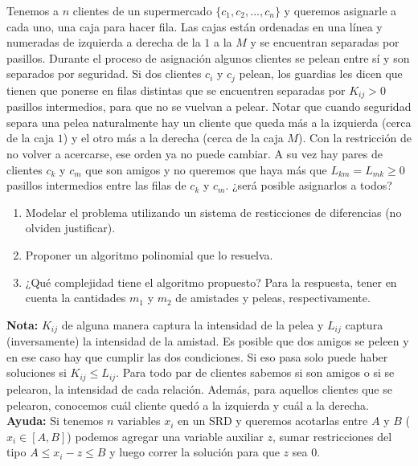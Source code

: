  
 \item Tenemos a $n$ clientes de un supermercado $\{c_1, c_2, ..., c_n\}$ y queremos asignarle a cada uno, una caja para hacer fila. Las cajas están ordenadas en una línea y numeradas de izquierda a derecha de la $1$ a la $M$ y se encuentran separadas por pasillos.  Durante el proceso de asignación algunos clientes se pelean entre sí y son separados por seguridad. Si dos clientes $c_i$ y $c_j$ pelean, los guardias les dicen que tienen que ponerse en filas distintas que se encuentren separadas por $K_{ij} > 0$ pasillos intermedios, para que no se vuelvan a pelear. Notar que cuando seguridad separa una pelea naturalmente hay un cliente que queda más a la izquierda (cerca de la caja $1$) y el otro más a la derecha (cerca de la caja $M$). Con la restricción de no volver a acercarse, ese orden ya no puede cambiar. A su vez hay pares de clientes $c_k$ y $c_m$ que son amigos y no queremos que haya más que $L_{km} = L_{mk} \geq 0$ pasillos intermedios entre las filas de $c_k$ y $c_m$. ¿será posible asignarlos a todos?


 \begin{enumerate}[label=$\alph*$.,ref=$\alph*$]
  \item Modelar el problema utilizando un sistema de resticciones de diferencias (no olviden justificar).
  \item Proponer un algoritmo polinomial que lo resuelva.
  \item ¿Qué complejidad tiene el algoritmo propuesto?  Para la respuesta, tener en cuenta la cantidades $m_1$ y $m_2$ de amistades y peleas, respectivamente.
 \end{enumerate}
 
 \textbf{Nota:} $K_{ij}$ de alguna manera captura la intensidad de la pelea y $L_{ij}$ captura (inversamente) la intensidad de la amistad. Es posible que dos amigos se peleen y en ese caso hay que cumplir las dos condiciones. Si eso pasa solo puede haber soluciones si $K_{ij} \leq L_{ij}$. Para todo par de clientes sabemos si son amigos o si se pelearon, la intensidad de cada relación.  Además, para aquellos clientes que se pelearon, conocemos cuál cliente quedó a la izquierda y cuál a la derecha.
 \newline
 \textbf{Ayuda:} Si tenemos $n$ variables $x_i$ en un SRD y queremos acotarlas entre $A$ y $B$  ($x_i \in [A, B]$) podemos agregar una variable auxiliar $z$, sumar restricciones del tipo $A \leq x_i - z \leq B$ y luego correr la solución para que $z$ sea $0$.

